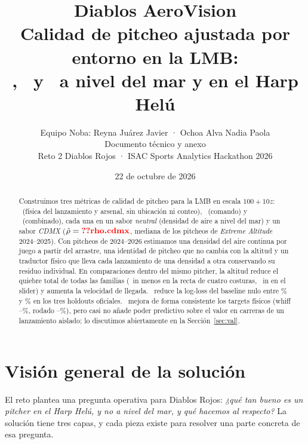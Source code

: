 \documentclass[10pt]{article}
\title{\textbf{Diablos AeroVision}\\[4pt]
\large Calidad de pitcheo ajustada por entorno en la LMB:\\ \splus, \lplus\ y \pplus\ a nivel del mar y en el Harp Helú}
\author{Equipo Noba: Reyna Juárez Javier · Ochoa Alva Nadia Paola\\Documento técnico y anexo\\Reto 2 Diablos Rojos · ISAC Sports Analytics Hackathon 2026}
\date{22 de octubre de 2026}
\begin{document}
\maketitle
\thispagestyle{fancy}

\begin{abstract}
\noindent
Construimos tres métricas de calidad de pitcheo para la LMB en escala $100 + 10z$: \splus\ (física del lanzamiento y arsenal, sin ubicación ni conteo), \lplus\ (comando) y \pplus\ (combinado), cada una en un sabor \emph{neutral} (densidad de aire a nivel del mar) y un sabor \emph{CDMX} ($\rhohat=\cf{rho.cdmx}$, mediana de los pitcheos de \emph{Extreme Altitude} 2024--2025). Con  pitcheos de 2024--2026 estimamos una densidad del aire continua por juego a partir del arrastre, una identidad de pitcheo que no cambia con la altitud y un traductor físico que lleva cada lanzamiento de una densidad a otra conservando su residuo individual. En comparaciones dentro del mismo pitcher, la altitud reduce el quiebre total de todas las familias (~in menos en la recta de cuatro costuras, ~in en el slider) y aumenta la velocidad de llegada. \pplus\ reduce la log-loss del baseline nulo entre \% y \% en los tres holdouts oficiales. \splus\ mejora de forma consistente los targets físicos (whiff --\%, rodado --\%), pero casi no añade poder predictivo sobre el valor en carreras de un lanzamiento aislado; lo discutimos abiertamente en la Sección~\ref{sec:val}.
\end{abstract}

\section{Visión general de la solución}
\label{sec:vision}

El reto plantea una pregunta operativa para Diablos Rojos: \emph{¿qué tan bueno es un pitcher en el Harp Helú, y no a nivel del mar, y qué hacemos al respecto?} La solución tiene tres capas, y cada pieza existe para resolver una parte concreta de esa pregunta.
\end{document}
